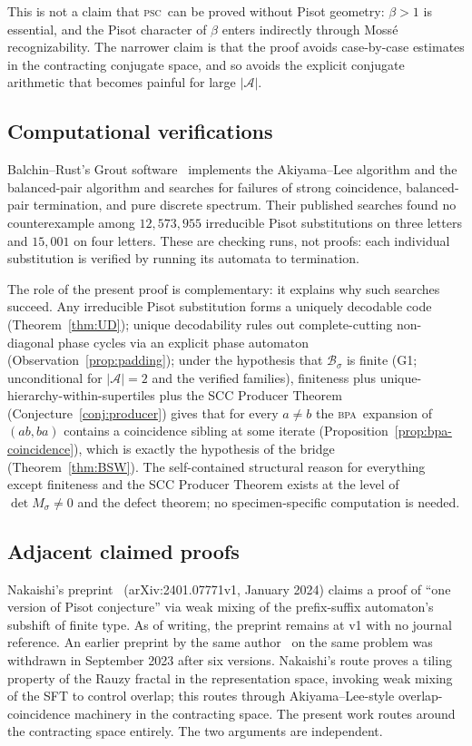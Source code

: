 \documentclass[11pt]{article}
\theoremstyle{plain}
\theoremstyle{definition}
\theoremstyle{remark}
\newcommand{\PSC}{\textsc{psc}}
\newcommand{\BPA}{\textsc{bpa}}
\newcommand{\PDS}{pure discrete spectrum}
\newcommand{\A}{\mathcal{A}}
\newcommand{\B}{\mathcal{B}}
\begin{document}
This is not a claim that \PSC\ can be proved without Pisot geometry: $\beta>1$ is essential, and the Pisot character of $\beta$ enters indirectly through Moss\'e recognizability. The narrower claim is that the proof avoids case-by-case estimates in the contracting conjugate space, and so avoids the explicit conjugate arithmetic that becomes painful for large $|\A|$.

\subsection{Computational verifications}\label{sec:comp-verif}

Balchin--Rust's Grout software~\cite{Balchin} implements the Akiyama--Lee algorithm and the balanced-pair algorithm and searches for failures of strong coincidence, balanced-pair termination, and \PDS. Their published searches found no counterexample among $12{,}573{,}955$ irreducible Pisot substitutions on three letters and $15{,}001$ on four letters. These are checking runs, not proofs: each individual substitution is verified by running its automata to termination.

The role of the present proof is complementary: it explains why such searches succeed. Any irreducible Pisot substitution forms a uniquely decodable code (Theorem~\ref{thm:UD}); unique decodability rules out complete-cutting non-diagonal phase cycles via an explicit phase automaton (Observation~\ref{prop:padding}); under the hypothesis that $\B_\sigma$ is finite (G1; unconditional for $|\A|=2$ and the verified families), finiteness plus unique-hierarchy-within-supertiles plus the SCC Producer Theorem (Conjecture~\ref{conj:producer}) gives that for every $a\ne b$ the \BPA\ expansion of $(ab,ba)$ contains a coincidence sibling at some iterate (Proposition~\ref{prop:bpa-coincidence}), which is exactly the hypothesis of the bridge (Theorem~\ref{thm:BSW}). The self-contained structural reason for everything except finiteness and the SCC Producer Theorem exists at the level of $\det M_\sigma\ne 0$ and the defect theorem; no specimen-specific computation is needed.

\subsection{Adjacent claimed proofs}\label{sec:adjacent}

Nakaishi's preprint~\cite{Nakaishi2024} (arXiv:2401.07771v1, January 2024) claims a proof of ``one version of Pisot conjecture'' via weak mixing of the prefix-suffix automaton's subshift of finite type. As of writing, the preprint remains at v1 with no journal reference. An earlier preprint by the same author~\cite{Nakaishi2016} on the same problem was withdrawn in September 2023 after six versions. Nakaishi's route proves a tiling property of the Rauzy fractal in the representation space, invoking weak mixing of the SFT to control overlap; this routes through Akiyama--Lee-style overlap-coincidence machinery in the contracting space. The present work routes around the contracting space entirely. The two arguments are independent.
\end{document}

